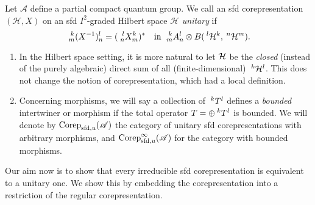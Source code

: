 \begin{Def} Let $\mathscr{A}$ define a partial compact quantum group. We call an sfd corepresentation $(\mathcal{H},X)$ on an sfd $I^2$-graded Hilbert space $\mathcal{H}$
\emph{unitary} if \[\Gr{(X^{-1})}{k}{l}{m}{n}=(\Gr{X}{l}{k}{n}{m})^{*}\quad \textrm{in }\Gr{A}{k}{l}{m}{n}\otimes B(\Gru{\Hsp}{l}{k},\Gru{\Hsp}{n}{m}).\]  
\end{Def} 
\begin{Rem} \begin{enumerate} \item In the Hilbert space setting, it is more natural to let $\Hsp$ be the \emph{closed} (instead of the purely algebraic) direct sum of all (finite-dimensional) $\Gru{\Hsp}{k}{l}$. This does not change the notion of corepresentation, which had a local definition.
\item Concerning morphisms, we will say a collection of $\Gru{T}{k}{l}$ defines a \emph{bounded} intertwiner or morphism if the total operator $T= \oplus \Gru{T}{k}{l}$ is bounded. We will denote by $\Corep_{\sfd,u}(\mathscr{A})$ the category of unitary sfd corepresentations with arbitrary morphisms, and $\Corep_{\sfd,u}^{\infty}(\mathscr{A})$ for the category with bounded morphisms.
\end{enumerate}
\end{Rem}

Our aim now is to show that every irreducible sfd corepresentation is
equivalent to a unitary one. We show this by embedding the corepresentation into a restriction of the
regular corepresentation.

